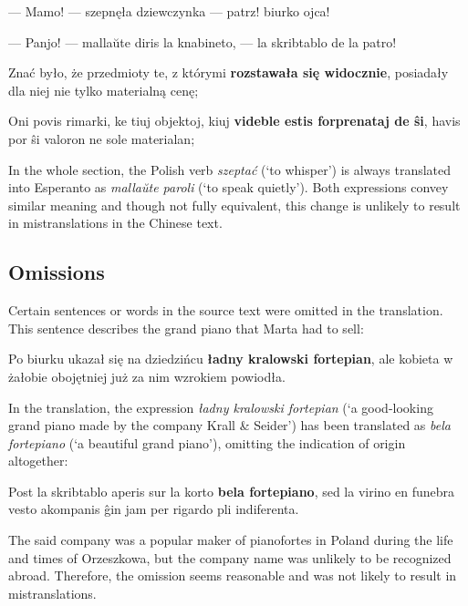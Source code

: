 --- Mamo! --- szepnęła dziewczynka --- patrz! biurko ojca!

--- Panjo! --- mallaŭte diris la knabineto, --- la skribtablo de la patro!

\begin{displayquote}
Znać było, że przedmioty te, z którymi \textbf{rozstawała się widocznie}, posiadały dla niej nie tylko materialną cenę;
\end{displayquote}

\begin{displayquote}
Oni povis rimarki, ke tiuj objektoj, kiuj \textbf{videble estis forprenataj de ŝi}, havis por ŝi valoron ne sole materialan;
\end{displayquote}

In the whole section, the Polish verb \textit{szeptać} (`to whisper') is always translated into Esperanto as \textit{mallaŭte paroli} (`to speak quietly').
Both expressions convey similar meaning and though not fully equivalent, this change is unlikely to result in mistranslations in the Chinese text.

\subsection{Omissions}

Certain sentences or words in the source text were omitted in the translation.
This sentence describes the grand piano that Marta had to sell:

\begin{displayquote}
Po biurku ukazał się na dziedzińcu \textbf{ładny kralowski fortepian}, ale kobieta w żałobie obojętniej już za nim wzrokiem powiodła.
\end{displayquote}

In the translation, the expression \textit{ładny kralowski fortepian} (`a good-looking grand piano made by the company Krall \& Seider') has been translated as \textit{bela fortepiano} (`a beautiful grand piano'), omitting the indication of origin altogether:

\begin{displayquote}
Post la skribtablo aperis sur la korto \textbf{bela fortepiano}, sed la virino en funebra vesto akompanis ĝin jam per rigardo pli indiferenta.
\end{displayquote}

The said company was a popular maker of pianofortes in Poland during the life and times of Orzeszkowa, but the company name was unlikely to be recognized abroad.
Therefore, the omission seems reasonable and was not likely to result in mistranslations.

